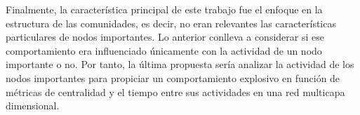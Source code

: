 \documentclass[../main.tex]{subfiles}
\begin{document}
Finalmente, la característica principal de este trabajo fue el enfoque en la estructura de las comunidades, es decir, no eran relevantes las características particulares de nodos importantes. Lo anterior conlleva a considerar si ese comportamiento era influenciado únicamente con la actividad de un nodo importante o no. Por tanto, la última propuesta sería analizar la actividad de los nodos importantes para propiciar un comportamiento explosivo en función de métricas de centralidad y el tiempo entre sus actividades en una red multicapa dimensional.












\end{document}
